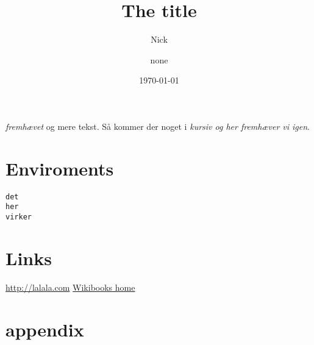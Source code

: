 

\title{The title}

\author{Nick \and none}
\date{\today}


\frontmatter
\maketitle
\newpage
\tableofcontents

\mainmatter


\emph{fremhævet} og mere tekst.
Så kommer der noget i \textit{kursiv
og her \emph{fremhæver} vi igen}.

\chapter{Enviroments}
\begin{alltt}
det 
	her
		virker
\end{alltt}
\chapter{Links}
\url{http://lalala.com}
\href{http://www.wikibooks.org}{Wikibooks home}
\appendix

\chapter{appendix}

